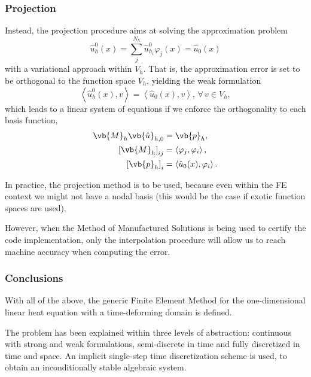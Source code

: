 \documentclass[../main.tex]{subfiles}
\newcommand{\inner}[2]{\left<#1, #2\right>}
\begin{document}
\subsubsection*{Projection}
Instead, the projection procedure aims at solving the approximation problem
\begin{equation}
    \hat{u}^{0}_h(x) = \sum_j^{N_h} \hat{u}_{h_i}^0 \varphi_j(x) = \hat{u}_0(x)
\end{equation}
with a variational approach within $V_h$. 
That is, the approximation error is set to be orthogonal to the function space $V_h$, yielding the weak formulation
\begin{equation}
    \inner{\hat{u}^{0}_h(x)}{v} = \inner{\hat{u}_0(x)}{v}, \, \forall \, v \in V_h,
\end{equation}
which leads to a linear system of equations if we enforce the orthogonality to each basis function,
\begin{subequations}
    \begin{align}
        \label{eq:projection_equation}
        \vb{M}_{h} \vb{\hat{u}}_{h,0} &= \vb{p}_h, \\
        \left[\vb{M}_{h}\right]_{ij} &= \inner{\varphi_j}{\varphi_i}, \\
        \left[\vb{p}_{h}\right]_{i} &= \inner{\hat{u}_0(x)}{\varphi_i}.
    \end{align}
\end{subequations}

In practice, the projection method is to be used, because even within the FE context we might not have a nodal basis (this would be the case if exotic function spaces are used).

However, when the Method of Manufactured Solutions is being used to certify the code implementation, only the interpolation procedure will allow us to reach machine accuracy when computing the error.

\subsubsection{Conclusions}
With all of the above, the generic Finite Element Method for the one-dimensional linear heat equation with a time-deforming domain is defined.

The problem has been explained within three levels of abstraction: continuous with strong and weak formulations, semi-discrete in time and fully discretized in time and space.
An implicit single-step time discretization scheme is used, to obtain an inconditionally stable algebraic system. 
\end{document}

